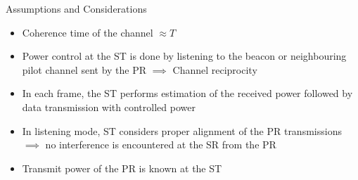 \documentclass[12pt]{beamer}
\begin{document}
\begin{frame}{Assumptions and Considerations}
\begin{itemize}
                \item Coherence time of the channel $\approx T$  
                \item Power control at the ST is done by listening to the beacon or neighbouring pilot channel sent by the PR $\implies$ Channel reciprocity 
                \item In each frame, the ST performs estimation of the received power followed by data transmission with controlled power 
                \item In listening mode, ST considers proper alignment of the PR transmissions $\implies$ no interference is encountered at the SR from the PR 
		\item Transmit power of the PR is known at the ST 
        \end{itemize}

\end{frame}
\end{document}

